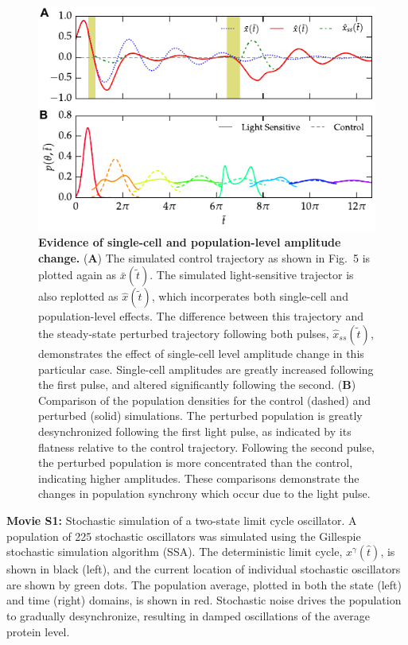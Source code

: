 \documentclass[11pt, letterpaper]{article}
\begin{document}
\begin{figure}[h!]
  \begin{center}
    \includegraphics[width=.75\textwidth]{figures/figure_S4.pdf}
    \caption{
{\bfseries Evidence of single-cell and population-level amplitude change.}
({\bfseries A}) The simulated control trajectory as shown in Fig.~5 is plotted again as $\bar{x}(\tilde{t})$.
The simulated light-sensitive trajector is also replotted as $\hat{x}(\tilde{t})$, which incorperates both single-cell and population-level effects.
The difference between this trajectory and the steady-state perturbed trajectory following both pulses, $\hat{x}_{ss}(\tilde{t})$, demonstrates the effect of single-cell level amplitude change in this particular case. 
Single-cell amplitudes are greatly increased following the first pulse, and altered significantly following the second.
({\bfseries B})
Comparison of the population densities for the control (dashed) and perturbed (solid) simulations.
The perturbed population is greatly desynchronized following the first light pulse, as indicated by its flatness relative to the control trajectory. 
Following the second pulse, the perturbed population is more concentrated than the control, indicating higher amplitudes. 
These comparisons demonstrate the changes in population synchrony which occur due to the light pulse. 
}
\end{center}
\end{figure}

\clearpage
{\bfseries Movie S1:} Stochastic simulation of a two-state limit
cycle oscillator. A population of 225 stochastic oscillators was simulated
using the Gillespie stochastic simulation algorithm (SSA). The deterministic
limit cycle, $x^\gamma(\hat{t})$, is shown in black (left), and the current
location of individual stochastic oscillators are shown by green dots. The
population average, plotted in both the state (left) and time (right) domains,
is shown in red. Stochastic noise drives the population to gradually
desynchronize, resulting in damped oscillations of the average protein level.
\\[2ex]
\end{document}
